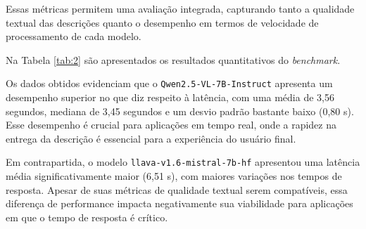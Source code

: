 Essas métricas permitem uma avaliação integrada, capturando tanto a qualidade textual das descrições quanto o desempenho em termos de velocidade de processamento de cada modelo. 

Na Tabela \ref{tab:2} são apresentados os resultados quantitativos do \textit{benchmark}.

\begin{table}[!ht]
\centering
\caption{Desempenho médio dos modelos em termos de latência e qualidade textual}
\label{tab:2}
\end{table}

Os dados obtidos evidenciam que o \texttt{Qwen2.5-VL-7B-Instruct} apresenta um desempenho superior no que diz respeito à latência, com uma média de 3,56 segundos, mediana de 3,45 segundos e um desvio padrão bastante baixo (0,80 s). Esse desempenho é crucial para aplicações em tempo real, onde a rapidez na entrega da descrição é essencial para a experiência do usuário final.

Em contrapartida, o modelo \texttt{llava-v1.6-mistral-7b-hf} apresentou uma latência média significativamente maior (6,51 s), com maiores variações nos tempos de resposta. Apesar de suas métricas de qualidade textual serem compatíveis, essa diferença de performance impacta negativamente sua viabilidade para aplicações em que o tempo de resposta é crítico.

